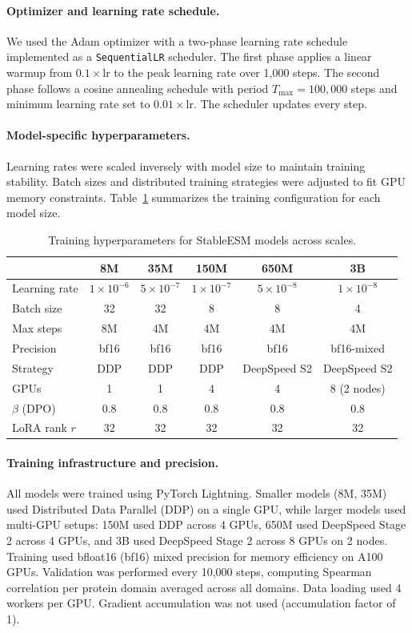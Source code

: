 \paragraph{Optimizer and learning rate schedule.}
We used the Adam optimizer with a two-phase learning rate schedule implemented as a \texttt{SequentialLR} scheduler.
The first phase applies a linear warmup from $0.1 \times \text{lr}$ to the peak learning rate over 1{,}000 steps.
The second phase follows a cosine annealing schedule with period $T_{\max} = 100{,}000$ steps and minimum learning rate set to $0.01 \times \text{lr}$.
The scheduler updates every step.

\paragraph{Model-specific hyperparameters.}
Learning rates were scaled inversely with model size to maintain training stability.
Batch sizes and distributed training strategies were adjusted to fit GPU memory constraints.
Table~\ref{tab:training_hyperparams} summarizes the training configuration for each model size.

\begin{table}[h]
\centering
\caption{Training hyperparameters for StableESM models across scales.}
\label{tab:training_hyperparams}
\small
\begin{tabular}{lccccc}
\toprule
 & \textbf{8M} & \textbf{35M} & \textbf{150M} & \textbf{650M} & \textbf{3B} \\
\midrule
Learning rate & $1 \times 10^{-6}$ & $5 \times 10^{-7}$ & $1 \times 10^{-7}$ & $5 \times 10^{-8}$ & $1 \times 10^{-8}$ \\
Batch size & 32 & 32 & 8 & 8 & 4 \\
Max steps & 8M & 4M & 4M & 4M & 4M \\
Precision & bf16 & bf16 & bf16 & bf16 & bf16-mixed \\
Strategy & DDP & DDP & DDP & DeepSpeed S2 & DeepSpeed S2 \\
GPUs & 1 & 1 & 4 & 4 & 8 (2 nodes) \\
$\beta$ (DPO) & 0.8 & 0.8 & 0.8 & 0.8 & 0.8 \\
LoRA rank $r$ & 32 & 32 & 32 & 32 & 32 \\
\bottomrule
\end{tabular}
\end{table}

\paragraph{Training infrastructure and precision.}
All models were trained using PyTorch Lightning.
Smaller models (8M, 35M) used Distributed Data Parallel (DDP) on a single GPU, while larger models used multi-GPU setups: 150M used DDP across 4 GPUs, 650M used DeepSpeed Stage 2 across 4 GPUs, and 3B used DeepSpeed Stage 2 across 8 GPUs on 2 nodes.
Training used bfloat16 (bf16) mixed precision for memory efficiency on A100 GPUs.
Validation was performed every 10{,}000 steps, computing Spearman correlation per protein domain averaged across all domains.
Data loading used 4 workers per GPU.
Gradient accumulation was not used (accumulation factor of 1).

